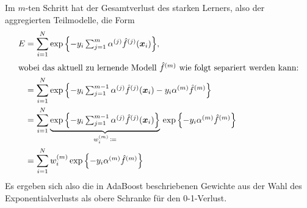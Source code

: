 				Im \(m\)-ten Schritt hat der Gesamtverlust des starken Lerners, also der aggregierten Teilmodelle, die Form
				\begin{align}
					E
						&= \sum_{i = 1}^{N} \exp\Big\{ { \textstyle -y_i \sum_{j = 1}^{m} \alpha^{(j)} \hat{f}^{(j)}(\vec{x}_i) } \Big\}, \\
					\intertext{wobei das aktuell zu lernende Modell \( \hat{f}^{(m)} \) wie folgt separiert werden kann:}
						&= \sum_{i = 1}^{N} \exp\Big\{ { \textstyle -y_i \sum_{j = 1}^{m - 1} \alpha^{(j)} \hat{f}^{(j)}(\vec{x}_i) - y_i \alpha^{(m)} \hat{f}^{(m)} } \Big\} \\
						&= \sum_{i = 1}^{N} \underbrace{\exp\Big\{ { \textstyle  -y_i \sum_{j = 1}^{m - 1} \alpha^{(j)} \hat{f}^{(j)}(\vec{x}_i) } \Big\}}_{w_i^{(m)} \,\coloneqq} \, \exp\Big\{ { \textstyle  -y_i \alpha^{(m)} \hat{f}^{(m)} } \Big\} \\
						&= \sum_{i = 1}^{N} w_i^{(m)} \exp\Big\{ { \textstyle  -y_i \alpha^{(m)} \hat{f}^{(m)} } \Big\}
				\end{align}
				Es ergeben sich also die in AdaBoost beschriebenen Gewichte aus der Wahl des Exponentialverlusts als obere Schranke für den 0-1-Verlust.


